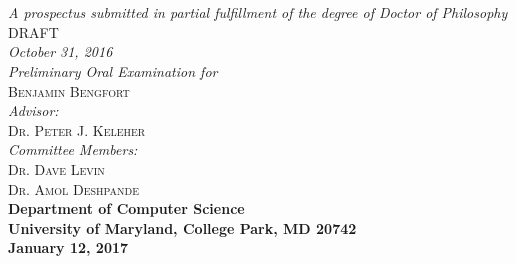\documentclass{article}
\begin{document}
\begin{titlepage}
\begin{center}

\textsc{\huge \bfseries {}}\\
\textsc{\huge \bfseries {}}\\[1.0cm]

\emph{A prospectus submitted in partial fulfillment of the degree of Doctor of
Philosophy}\\[5.5cm]

\textsc{\large DRAFT}\\
\emph{October 31, 2016}\\[2.0cm]

\emph{Preliminary Oral Examination for}\\
\textsc{\large Benjamin Bengfort}\\[2.0cm] %
\emph{Advisor:} \\
\textsc{Dr. Peter J. Keleher}\\[.5cm]
\emph{Committee Members:}\\
\textsc{Dr. Dave Levin}\\
\textsc{Dr. Amol Deshpande}\\[4.0cm]

{\bfseries Department of Computer Science}\\
{\bfseries University of Maryland, College Park, MD 20742}\\
{\bfseries January 12, 2017}
\vfill

\end{center}

\end{titlepage}

\newpage
\thispagestyle{empty}
\mbox{}
\end{document}
